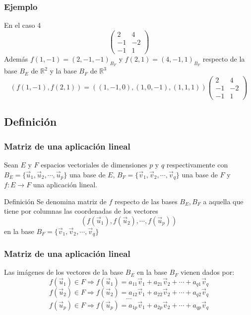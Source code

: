 \documentclass{beamer}
\begin{document}
   \begin{frame}
  \frametitle{Ejemplo}
En el caso 4
 \[\left(\begin{array}{rr}2 & 4 \\-1 & -2 \\-1 & 1\end{array}\right)\]
 Adem\'as $f(1,-1) = (2,-1,-1)_{B_F}$ y $f(2,1)=(4,-1,1)_{B_F}$ respecto de la base $B_E$ de $\mathbb R^2$ y la base $B_F$ de $\mathbb R^3$
 \[ (f(1,-1), f(2,1)) = ((1,-1,0),(1,0,-1),(1,1,1)) \left(\begin{array}{rr}2 & 4 \\-1 & -2 \\-1 & 1\end{array}\right)\]
  \end{frame}
    
  
\subsection{Definici\'on}

   \begin{frame}
  \frametitle{Matriz de una aplicaci\'on lineal}
Sean $E$ y $F$ espacios vectoriales de dimensiones $p$ y $q$ respectivamente con $B_E=\{\vec u_1, \vec u_2, \cdots, \vec u_p\}$ una base de $E$, $B_F=\{\vec v_1, \vec v_2, \cdots, \vec v_q\}$ una base de $F$ y $f:E\longrightarrow F$ una aplicaci\'on lineal. 
\begin{block}{Definici\'on}
Se denomina matriz de $f$ respecto de las bases $B_E, B_F$ a aquella que tiene por columnas las coordenadas de los vectores \[(f(\vec u_1), f(\vec u_2), \cdots, f(\vec u_p))\] en la base $B_F=\{\vec v_1, \vec v_2, \cdots, \vec v_q\}$
\end{block}
  \end{frame}
  
     \begin{frame}
  \frametitle{Matriz de una aplicaci\'on lineal}
  Las im\'agenes de los vectores de la base $B_E$ en la base $B_F$ vienen dados por:
 \[ f(\vec u_1)\in F \Longrightarrow f(\vec u_1) = a_{11} \vec v_1+a_{21}\vec v_2+\cdots + a_{q1}\vec v_q\]
\[ f(\vec u_2)\in F \Longrightarrow f(\vec u_2) = a_{12} \vec v_1+a_{22}\vec v_2+\cdots + a_{q2}\vec v_q\]
\[ \cdots \]
\[ f(\vec u_p)\in F \Longrightarrow f(\vec u_p) = a_{1p} \vec v_1+a_{2p}\vec v_2+\cdots + a_{qp}\vec v_q\]
  \end{frame}
  
\end{document}
